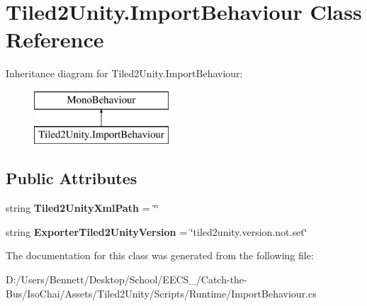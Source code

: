 \hypertarget{class_tiled2_unity_1_1_import_behaviour}{}\section{Tiled2\+Unity.\+Import\+Behaviour Class Reference}
\label{class_tiled2_unity_1_1_import_behaviour}
Inheritance diagram for Tiled2\+Unity.\+Import\+Behaviour\+:\begin{figure}[H]
\begin{center}
\leavevmode
\includegraphics[height=2.000000cm]{class_tiled2_unity_1_1_import_behaviour}
\end{center}
\end{figure}
\subsection*{Public Attributes}
\begin{DoxyCompactItemize}
\item 
\mbox{\label{class_tiled2_unity_1_1_import_behaviour_a8562ebe80cd0f8e44403ec3eb604ddfd}} 
string {\bfseries Tiled2\+Unity\+Xml\+Path} = \char`\"{}\char`\"{}
\item 
\mbox{\label{class_tiled2_unity_1_1_import_behaviour_ad8c0fb24237c9f5fa29ebb4946420805}} 
string {\bfseries Exporter\+Tiled2\+Unity\+Version} = \char`\"{}tiled2unity.\+version.\+not.\+set\char`\"{}
\end{DoxyCompactItemize}


The documentation for this class was generated from the following file\+:\begin{DoxyCompactItemize}
\item 
D\+:/\+Users/\+Bennett/\+Desktop/\+School/\+E\+E\+C\+S\+\_/\+Catch-\/the-\/\+Bus/\+Iso\+Chai/\+Assets/\+Tiled2\+Unity/\+Scripts/\+Runtime/Import\+Behaviour.\+cs\end{DoxyCompactItemize}
